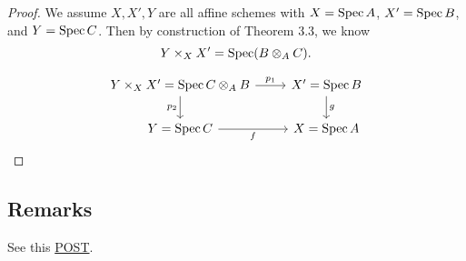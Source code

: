 \begin{proof}
    We assume $X,X',Y$ are all affine schemes with $X=\operatorname{Spec} A$, $X'=\operatorname{Spec} B$, and $Y=\operatorname{Spec} C$. Then by construction of Theorem 3.3, we know 
    \[Y\times_{X}X'=\operatorname{Spec} (B\otimes_A C).\]

\[\begin{tikzcd}
	{Y\times_{X}X'=\operatorname{Spec} C\otimes_{A}B} & {X'=\operatorname{Spec} B} \\
	{Y=\operatorname{Spec} C} & {X=\operatorname{Spec} A}
	\arrow["{p_1}", from=1-1, to=1-2]
	\arrow["{p_2}"', from=1-1, to=2-1]
	\arrow["g", from=1-2, to=2-2]
	\arrow["f"', from=2-1, to=2-2]
\end{tikzcd}\]

\end{proof}

\subsection{Remarks}

See this \href{https://math.stackexchange.com/questions/1079356/closed-immersions-are-stable-under-base-change}{POST}.